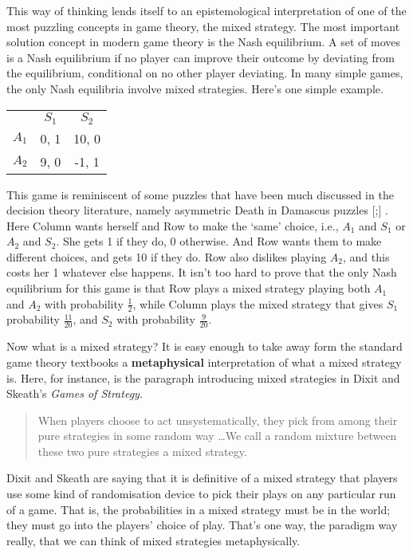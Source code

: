 \documentclass[11pt,]{book}
\def\toprule{}
\def\bottomrule{}
\begin{document}
This way of thinking lends itself to an epistemological interpretation of one of the most puzzling concepts in game theory, the mixed strategy. The most important solution concept in modern game theory is the Nash equilibrium. A set of moves is a Nash equilibrium if no player can improve their outcome by deviating from the equilibrium, conditional on no other player deviating. In many simple games, the only Nash equilibria involve mixed strategies. Here's one simple example.

\begin{longtable}[]{@{}lcc@{}}
\toprule
\endhead
& \(S_1\) & \(S_2\)\tabularnewline
\(A_1\) & 0, 1 & 10, 0\tabularnewline
\(A_2\) & 9, 0 & -1, 1\tabularnewline
\bottomrule
\end{longtable}

This game is reminiscent of some puzzles that have been much discussed in the decision theory literature, namely asymmetric Death in Damascus puzzles {[}\citet{Richter1984};{]} . Here Column wants herself and Row to make the `same' choice, i.e., \(A_1\) and \(S_1\) or \(A_2\) and \(S_2\). She gets 1 if they do, 0 otherwise. And Row wants them to make different choices, and gets 10 if they do. Row also dislikes playing \(A_2\), and this costs her 1 whatever else happens. It isn't too hard to prove that the only Nash equilibrium for this game is that Row plays a mixed strategy playing both \(A_1\) and \(A_2\) with probability \(\frac{1}{2}\), while Column plays the mixed strategy that gives \(S_1\) probability \(\frac{11}{20}\), and \(S_2\) with probability \(\frac{9}{20}\).

Now what is a mixed strategy? It is easy enough to take away form the standard game theory textbooks a \textbf{metaphysical} interpretation of what a mixed strategy is. Here, for instance, is the paragraph introducing mixed strategies in Dixit and Skeath's \emph{Games of Strategy}.

\begin{quote}
When players choose to act unsystematically, they pick from among their pure strategies in some random way \ldots{}We call a random mixture between these two pure strategies a mixed strategy. \citep[ 186]{DixitSkeath2004}
\end{quote}

Dixit and Skeath are saying that it is definitive of a mixed strategy that players use some kind of randomisation device to pick their plays on any particular run of a game. That is, the probabilities in a mixed strategy must be in the world; they must go into the players' choice of play. That's one way, the paradigm way really, that we can think of mixed strategies metaphysically.
\end{document}
